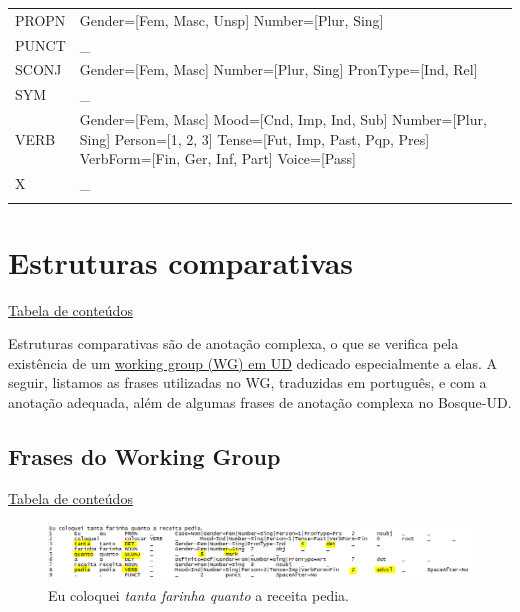 \documentclass[output=paper,colorlinks,citecolor=brown]{langscibook}
\begin{document}
\begin{longtable}{ p{1.5cm} | p{10cm} }
PROPN & Gender=[Fem, Masc, Unsp] \newline Number=[Plur, Sing] \newline \\
PUNCT & \_ \newline\\
SCONJ & Gender=[Fem, Masc] \newline Number=[Plur, Sing] \newline PronType=[Ind, Rel] \newline \\
SYM & \_ \newline\\
VERB & Gender=[Fem, Masc] \newline Mood=[Cnd, Imp, Ind, Sub] \newline Number=[Plur, Sing] \newline Person=[1, 2, 3] \newline Tense=[Fut, Imp, Past, Pqp, Pres] \newline VerbForm=[Fin, Ger, Inf, Part] \newline Voice=[Pass] \newline \\
X & \_ \\

\label{tab:feats}
\end{longtable}

\section{Estruturas comparativas}

\hyperlink{toc}{Tabela de conteúdos\\}

Estruturas comparativas são de anotação complexa, o que se verifica pela existência de um \href{https://universaldependencies.org/workgroups/comparatives.html}{working group (WG) em UD} dedicado especialmente a elas. A seguir, listamos as frases utilizadas no WG, traduzidas em português, e com a anotação adequada, além de algumas frases de anotação complexa no Bosque-UD.

\subsection{Frases do Working Group}

\hyperlink{toc}{Tabela de conteúdos\\}

\begin{figure}
    \centering
    \includegraphics[width=\textwidth,height=\textheight,keepaspectratio]{imagesDrive/image20.png}
    \caption{Eu coloquei \emph{tanta farinha quanto} a receita pedia.}
    \label{fig:comparative1}
    \end{figure}{}
\end{document}
